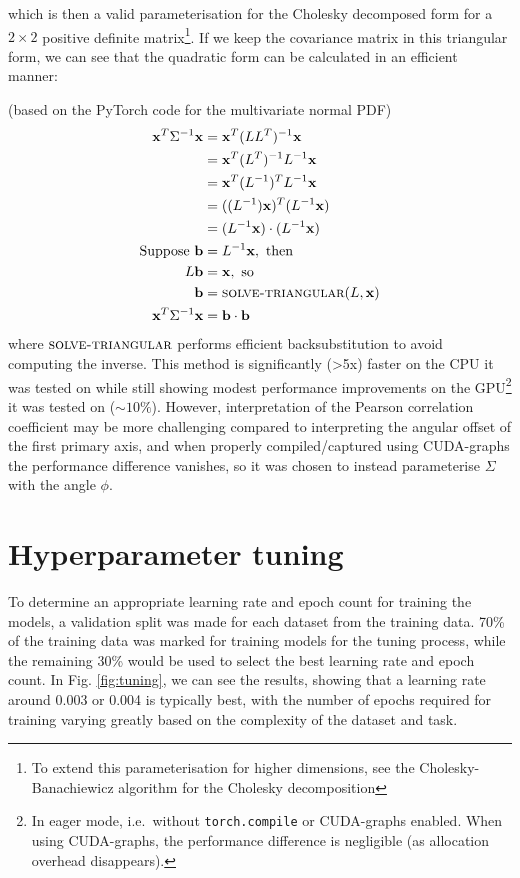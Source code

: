\documentclass[a4paper, 12pt]{report}
\begin{document}
which is then a valid parameterisation for the Cholesky decomposed form for a $2\times 2$ positive definite matrix\footnote{To extend this parameterisation for higher dimensions, see the  Cholesky-Banachiewicz algorithm for the Cholesky decomposition}. If we keep the covariance matrix in this triangular form, we can see that the quadratic form can be calculated in an efficient manner:

(based on the PyTorch code for the multivariate normal PDF)
\begin{align}
	\mathbf{x}^T\Sigma^{-1}\mathbf{x}
	&= \mathbf{x}^T(LL^T)^{-1}\mathbf{x}\\
	&= \mathbf{x}^T(L^T)^{-1}L^{-1}\mathbf{x}\\
	&= \mathbf{x}^T(L^{-1})^{T}L^{-1}\mathbf{x}\\
	&= ((L^{-1})\mathbf{x})^T(L^{-1}\mathbf{x})\\
	&= (L^{-1}\mathbf{x})\cdot(L^{-1}\mathbf{x})\\
\textrm{Suppose }\mathbf{b}&=L^{-1}\mathbf{x}, \textrm{ then} \nonumber\\
	L\mathbf{b}&=\mathbf{x}, \textrm{ so}\nonumber\\
	\mathbf{b}&= \textsc{solve-triangular}(L, \mathbf{x})\\
	\mathbf{x}^T\Sigma^{-1}\mathbf{x} &= \mathbf{b}\cdot\mathbf{b}
\end{align}
where $\textsc{solve-triangular}$ performs efficient backsubstitution to avoid computing the inverse. This method is significantly (>5x) faster on the CPU it was tested on while still showing modest performance improvements on the GPU\footnote{In eager mode, i.e.\ without \lstinline{torch.compile} or CUDA-graphs enabled. When using CUDA-graphs, the performance difference is negligible (as allocation overhead disappears).} it was tested on ($\sim 10\%$). However, interpretation of the Pearson correlation coefficient may be more challenging compared to interpreting the angular offset of the first primary axis, and when properly compiled/captured using CUDA-graphs the performance difference vanishes, so it was chosen to instead parameterise $\Sigma$ with the angle $\phi$.

\newpage
\section{Hyperparameter tuning }
\label{sec:hyperparameters}
To determine an appropriate learning rate and epoch count for training the models, a validation split was made for each dataset from the training data. 70\% of the training data was marked for training models for the tuning process, while the remaining 30\% would be used to select the best learning rate and epoch count.
In Fig. \ref{fig:tuning}, we can see the results, showing that a learning rate around 0.003 or 0.004 is typically best, with the number of epochs required for training varying greatly based on the complexity of the dataset and task. 
\end{document}
